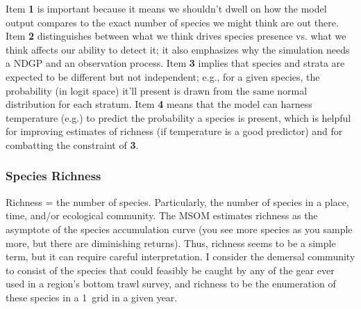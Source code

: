 \documentclass{article}\usepackage[]{graphicx}\usepackage[]{color}
\begin{document}
\par
Item \bm{\#}\textbf{1} is important because it means we shouldn't dwell on how the model output compares to the exact number of species we might think are out there. Item \bm{\#}\textbf{2} distinguishes between what we think drives species presence vs. what we think affects our ability to detect it; it also emphasizes why the simulation needs a NDGP and an observation process. Item \bm{\#}\textbf{3} implies that species and strata are expected to be different but not independent; e.g., for a given species, the probability (in logit space) it'll present is drawn from the same normal distribution for each stratum. Item \bm{\#}\textbf{4} means that the model can harness temperature (e.g.) to predict the probability a species is present, which is helpful for improving estimates of richness (if temperature is a good predictor) and for combatting the constraint of \bm{\#}\textbf{3}.

\subsubsection{Species Richness}
\par
Richness = the number of species. Particularly, the number of species in a place, time, and/or ecological community. The MSOM estimates richness as the asymptote of the species accumulation curve (you see more species as you sample more, but there are diminishing returns). Thus, richness seems to be a simple term, but it can require careful interpretation. I consider the demersal community to consist of the species that could feasibly be caught by any of the gear ever used in a region's bottom trawl survey, and richness to be the enumeration of these species in a 1\degree~grid in a given year.

\end{document}
